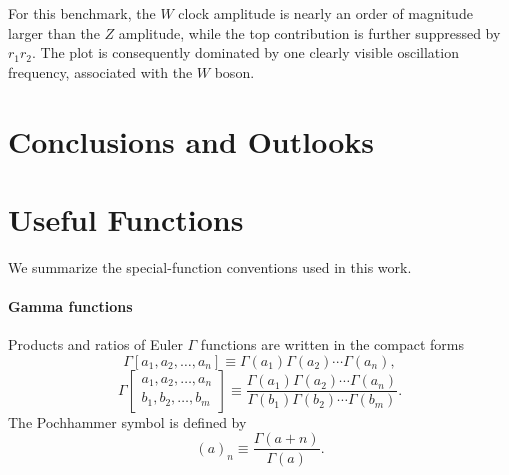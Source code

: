 \documentclass[a4paper,12pt]{article}
\begin{document}
For this benchmark, the $W$ clock amplitude is nearly an order of magnitude larger than the $Z$ amplitude, while the top contribution is further suppressed by $r_1r_2$.
The plot is consequently dominated by one clearly visible oscillation frequency, associated with the $W$ boson.

\section{Conclusions and Outlooks}

\clearpage

\appendix
\section{Useful Functions}
\label{app:useful-functions}
We summarize the special-function conventions used in this work.

\paragraph{Gamma functions}
Products and ratios of Euler $\Gamma$ functions are written in the compact forms
\begin{equation}
    \Gamma[a_1,a_2,\ldots,a_n]
    \equiv\Gamma(a_1)\Gamma(a_2)\cdots\Gamma(a_n),
    \label{eq:useful-gamma-product}
\end{equation}
\begin{equation}
    \Gamma\!\left[\begin{matrix}
        a_1,a_2,\ldots,a_n\\
        b_1,b_2,\ldots,b_m
    \end{matrix}\right]
    \equiv\frac{\Gamma(a_1)\Gamma(a_2)\cdots\Gamma(a_n)}
    {\Gamma(b_1)\Gamma(b_2)\cdots\Gamma(b_m)}.
    \label{eq:useful-gamma-ratio}
\end{equation}
The Pochhammer symbol is defined by
\begin{equation}
    (a)_n\equiv\frac{\Gamma(a+n)}{\Gamma(a)}.
    \label{eq:useful-pochhammer}
\end{equation}
\end{document}
